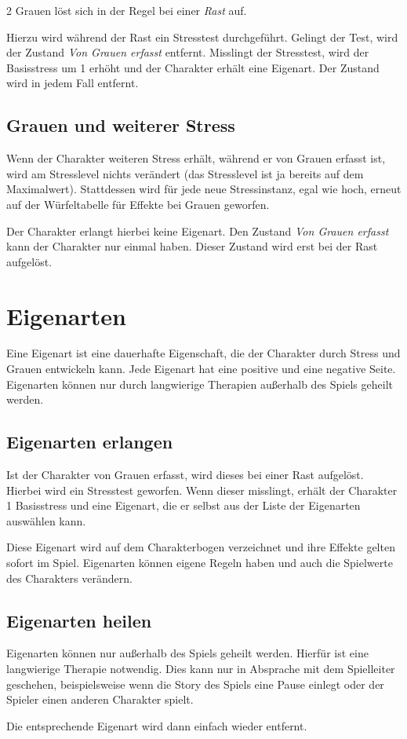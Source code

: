 \begin{multicols}{2}
Grauen löst sich in der Regel bei einer \textit{Rast} auf.

Hierzu wird während der Rast ein Stresstest durchgeführt. Gelingt der Test, wird der Zustand \textit{Von Grauen erfasst} entfernt. Misslingt der Stresstest, wird der Basisstress um 1 erhöht und der Charakter erhält eine Eigenart. Der Zustand wird in jedem Fall entfernt.

\subsection{Grauen und weiterer Stress}

Wenn der Charakter weiteren Stress erhält, während er von Grauen erfasst ist, wird am Stresslevel nichts verändert (das Stresslevel ist ja bereits auf dem Maximalwert). Stattdessen wird für jede neue Stressinstanz, egal wie hoch, erneut auf der Würfeltabelle für Effekte bei Grauen geworfen.

Der Charakter erlangt hierbei keine Eigenart. Den Zustand \textit{Von Grauen erfasst} kann der Charakter nur einmal haben. Dieser Zustand wird erst bei der Rast aufgelöst.

\section{Eigenarten}

Eine Eigenart ist eine dauerhafte Eigenschaft, die der Charakter durch Stress und Grauen entwickeln kann. Jede Eigenart hat eine positive und eine negative Seite. Eigenarten können nur durch langwierige Therapien außerhalb des Spiels geheilt werden.

\subsection{Eigenarten erlangen}

Ist der Charakter von Grauen erfasst, wird dieses bei einer Rast aufgelöst. Hierbei wird ein Stresstest geworfen. Wenn dieser misslingt, erhält der Charakter 1 Basisstress und eine Eigenart, die er selbst aus der Liste der Eigenarten auswählen kann.

Diese Eigenart wird auf dem Charakterbogen verzeichnet und ihre Effekte gelten sofort im Spiel. Eigenarten können eigene Regeln haben und auch die Spielwerte des Charakters verändern.

\subsection{Eigenarten heilen}

Eigenarten können nur außerhalb des Spiels geheilt werden. Hierfür ist eine langwierige Therapie notwendig. Dies kann nur in Absprache mit dem Spielleiter geschehen, beispielsweise wenn die Story des Spiels eine Pause einlegt oder der Spieler einen anderen Charakter spielt.

Die entsprechende Eigenart wird dann einfach wieder entfernt.
\end{multicols}

